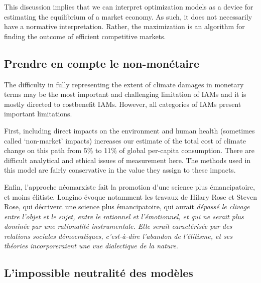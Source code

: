 \begin{authoredquote}
    This discussion implies that we can interpret optimization models as a device for estimating the equilibrium of a market economy. As such, it does not necessarily have a normative interpretation. Rather, the maximization is an algorithm for finding the outcome of efficient competitive markets.
\end{authoredquote}



\subsection{Prendre en compte le non-monétaire}


\begin{authoredquote}
    The difficulty in fully representing the extent of climate damages in monetary terms may be the most important and challenging limitation of IAMs and it is mostly directed to costbenefit IAMs. However, all categories of IAMs present important limitations.
\end{authoredquote}




\begin{authoredquote}
    First, including direct impacts on the environment and human health (sometimes called ‘non-market’ impacts) increases our estimate of the total cost of climate change on this path from 5\% to 11\% of global per-capita consumption. There are difficult analytical and ethical issues of measurement here. The methods used in this model are fairly conservative in the value they assign to these impacts.  
\end{authoredquote}

Enfin, l'approche néomarxiste fait la promotion d'une science plus émancipatoire, et moins élitiste. Longino évoque notamment les travaux de Hilary Rose et Steven Rose, qui décrivent une science plus émancipatoire, qui aurait \emph{dépassé le clivage entre l'objet et le sujet, entre le rationnel et l'émotionnel, et qui ne serait plus dominée par une rationalité instrumentale. Elle serait caractérisée par des relations sociales démocratiques, c'est-à-dire l'abandon de l'élitisme, et ses théories incorporeraient une vue dialectique de la nature}.


\subsection{L'impossible neutralité des modèles}

